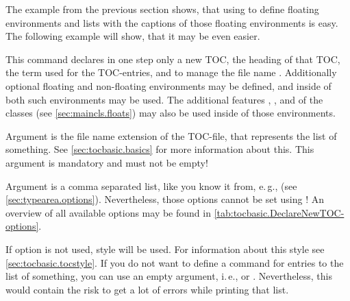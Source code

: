 The example from the previous section shows, that using  to
define floating environments and lists with the captions of those floating
environments is easy. The following example will show, that it may be even
easier.

\begin{Declaration}
\end{Declaration}
This command declares in one step only a
new TOC, the heading of that TOC, the term used for the TOC-entries, and to
manage the file name . Additionally optional floating and
non-floating environments may be defined, and inside of both such environments
%
 may be used. The
additional features , , and
 of the \KOMAScript{} classes (see
\autoref{sec:maincls.floats}) may also be used inside of those environments.

Argument  is the file name extension of the TOC-file, that
represents the list of something. See \autoref{sec:tocbasic.basics} for more
information about this. This argument is mandatory and must not be empty!

Argument  is a comma separated list, like you know it from,
e.\,g.,  (see
\autoref{sec:typearea.options}). Nevertheless, those
options cannot be set using
! An overview of all
available options may be found in
\autoref{tab:tocbasic.DeclareNewTOC-options}.

If option 
is not used, style  will be used. For information about this
style see \autoref{sec:tocbasic.tocstyle}. If you do not want to define a
command for entries to the list of something, you can use an empty argument,
i.\,e.,  or
. Nevertheless, this would contain
the risk to get a lot of errors while printing that list.

